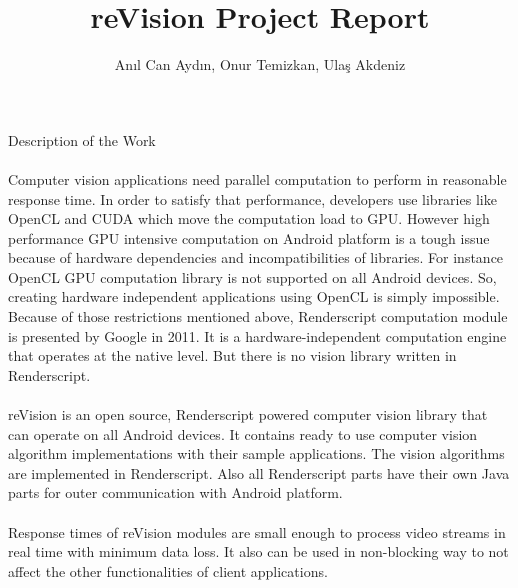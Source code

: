 \documentclass[12pt, a4paper]{article} \pagenumbering{gobble}
\begin{document}
  \author{An{\i}l Can Ayd{\i}n, Onur Temizkan, Ula\c{s} Akdeniz}
  \title{reVision Project Report}
  \maketitle

\begin{section}{Description of the Work}
\paragraph{}{Computer vision applications need parallel computation to perform in reasonable response time. In order to satisfy that performance, developers use libraries like OpenCL and CUDA which move the computation load to GPU. However high performance GPU intensive computation on Android platform is a tough issue because of hardware dependencies and incompatibilities of libraries. For instance OpenCL GPU computation library is not supported on all Android devices. So, creating hardware independent applications using OpenCL is simply impossible. Because of those restrictions mentioned above, Renderscript computation module is presented by Google in 2011. It is ﻿a hardware-independent computation engine that operates at the native level. But there is no vision library written in Renderscript.}
\paragraph{}{reVision is an open source, Renderscript powered computer vision library that can operate on all Android devices. It contains ready to use computer vision algorithm implementations with their sample applications. The vision algorithms are implemented in Renderscript. Also all Renderscript parts have their own Java parts for outer communication with Android platform.}
\paragraph{}{Response times of reVision modules are small enough to process video streams in real time with minimum data loss. It also can be used in non-blocking way to not affect the other functionalities of client applications.}
\end{section}

\newpage
\end{document}
